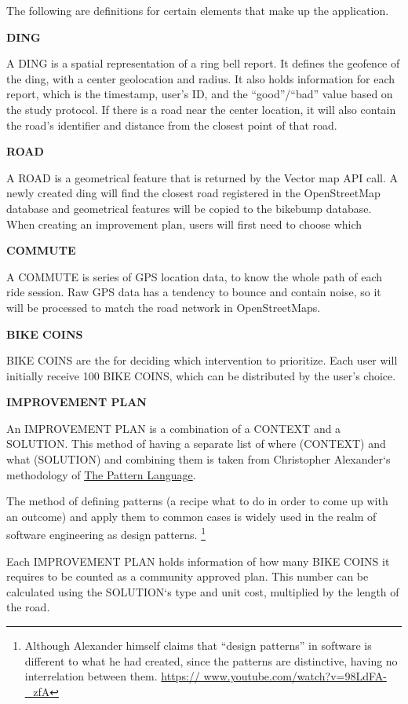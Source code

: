 The following are definitions for certain elements that make up the application.

\textbf{DING}

A DING is a spatial representation of a ring bell report. It defines the geofence of the ding, with a center geolocation and radius. It also holds information for each report, which is the timestamp, user's ID, and the ``good''/``bad'' value based on the study protocol. If there is a road near the center location, it will also contain the road's identifier and distance from the closest point of that road.


\textbf{ROAD}

A ROAD is a geometrical feature that is returned by the Vector map API call. A newly created ding will find the closest road registered in the OpenStreetMap database and geometrical features will be copied to the bikebump database. When creating an improvement plan, users will first need to choose which


\textbf{COMMUTE}

A COMMUTE is series of GPS location data, to know the whole path of each ride session. Raw GPS data has a tendency to bounce and contain noise, so it will be processed to match the road network in OpenStreetMaps.


\textbf{BIKE COINS}

BIKE COINS are the  for deciding which intervention to prioritize. Each user will initially receive 100 BIKE COINS, which can be distributed by the user's choice.

\textbf{IMPROVEMENT PLAN}

An IMPROVEMENT PLAN is a combination of a CONTEXT and a SOLUTION. This method of having a separate list of where (CONTEXT) and what (SOLUTION) and combining them is taken from Christopher Alexander‘s methodology of \underline{The Pattern Language}. \cite{alexander1977pattern}


The method of defining patterns (a recipe what to do in order to come up with an outcome) and apply them to common cases is widely used in the realm of software engineering as design patterns. 
\footnote{Although Alexander himself claims that “design patterns” in software is different to what he had created, since the patterns are distinctive, having no interrelation between them. \url{https:// www.youtube.com/watch?v=98LdFA-_zfA}
}

Each IMPROVEMENT PLAN holds information of how many BIKE COINS it requires to be counted as a community approved plan. This number can be calculated using the SOLUTION‘s type and unit cost, multiplied by the length of the road.


